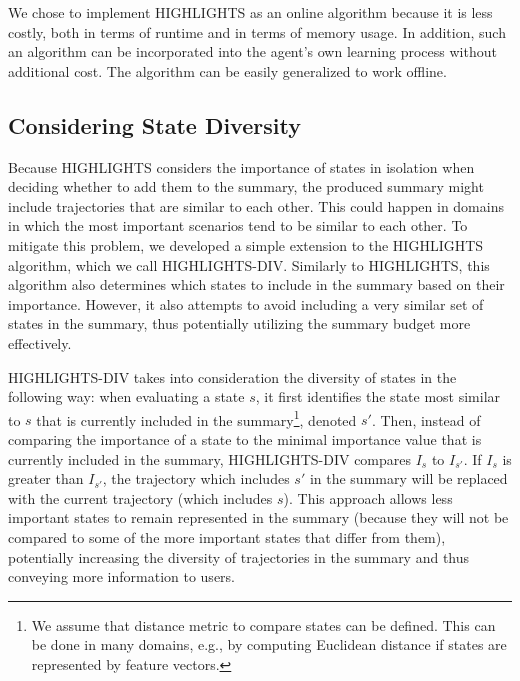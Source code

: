 

 We chose to implement HIGHLIGHTS as an online algorithm  because it is less costly, both in terms of runtime and in terms of memory usage. 
 In addition, such an algorithm can be incorporated into the agent's own learning process without additional cost. The algorithm can be easily generalized to work offline. 
 
\subsection{Considering State Diversity}
\label{sec:algDiv}
Because HIGHLIGHTS  considers the importance of states in isolation when deciding whether to add them to the summary, the produced summary might include trajectories that are similar to each other. This could happen in domains in which the most important scenarios tend to be similar to each other. To mitigate this problem, we developed a simple extension to the HIGHLIGHTS algorithm, which we call HIGHLIGHTS-DIV. Similarly to HIGHLIGHTS, this algorithm also determines which states to include in the summary based on their importance. However, it also attempts to avoid including a very similar set of states in the summary, thus potentially utilizing the summary budget more effectively. 

HIGHLIGHTS-DIV takes into consideration the diversity of states in the following way: when evaluating a state $s$, it first identifies the state most similar to $s$ that is currently included in the summary\footnote{We assume that distance metric to compare states can be defined. This can be done in many domains,  e.g., by computing Euclidean distance if states are represented by feature vectors.}, denoted $s'$. Then, instead of comparing the importance of a state to the minimal importance value that is currently included in the summary, HIGHLIGHTS-DIV compares $I_{s}$ to $I_{s'}$. If $I_{s}$ is greater than $I_{s'}$, the trajectory which includes $s'$ in the summary will be replaced with the current trajectory (which includes $s$). This approach allows less important states to remain represented in the summary (because they will not be compared to some of the more important states that differ from them), potentially increasing the diversity of trajectories in the summary and thus conveying more information to users. 





